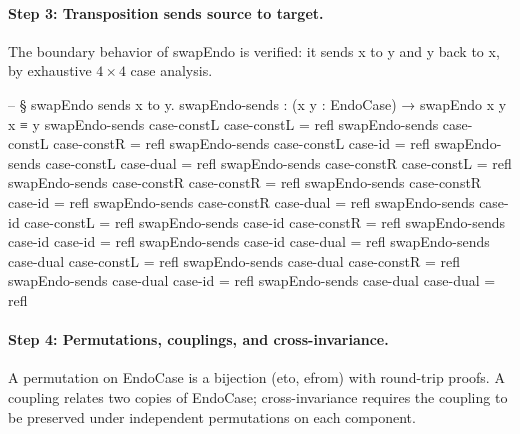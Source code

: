 \documentclass[11pt,a4paper]{book}
\def\texttt#1{#1}%
\begin{document}
\paragraph{Step 3: Transposition sends source to target.}
The boundary behavior of \texttt{swapEndo} is verified: it sends \texttt{x} to \texttt{y} and \texttt{y} back to \texttt{x}, by exhaustive $4 \times 4$ case analysis.

\begin{code}
-- § swapEndo sends x to y.
swapEndo-sends : (x y : EndoCase) → swapEndo x y x ≡ y
swapEndo-sends case-constL case-constL = refl
swapEndo-sends case-constL case-constR = refl
swapEndo-sends case-constL case-id     = refl
swapEndo-sends case-constL case-dual   = refl
swapEndo-sends case-constR case-constL = refl
swapEndo-sends case-constR case-constR = refl
swapEndo-sends case-constR case-id     = refl
swapEndo-sends case-constR case-dual   = refl
swapEndo-sends case-id     case-constL = refl
swapEndo-sends case-id     case-constR = refl
swapEndo-sends case-id     case-id     = refl
swapEndo-sends case-id     case-dual   = refl
swapEndo-sends case-dual   case-constL = refl
swapEndo-sends case-dual   case-constR = refl
swapEndo-sends case-dual   case-id     = refl
swapEndo-sends case-dual   case-dual   = refl
\end{code}

\paragraph{Step 4: Permutations, couplings, and cross-invariance.}
A permutation on \texttt{EndoCase} is a bijection \texttt{(eto, efrom)} with round-trip proofs.
A coupling relates two copies of \texttt{EndoCase}; cross-invariance requires the coupling to be preserved under independent permutations on each component.
\end{document}
